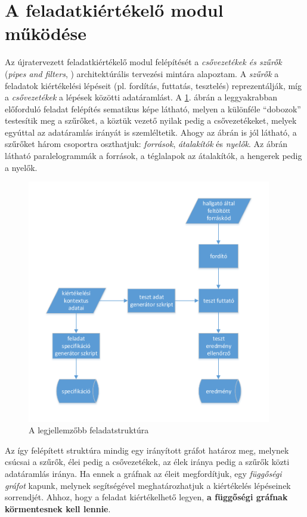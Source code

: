 \section{A feladatkiértékelő modul működése}
Az újratervezett feladatkiértékelő modul felépítését a \textit{csővezetékek és szűrők} (\textit{pipes and filters}, \cite{PipesAndFilters}) architektúrális tervezési mintára alapoztam.
A \textit{szűrők} a feladatok kiértékelési lépéseit (pl. fordítás, futtatás, tesztelés) reprezentálják, míg a \textit{csővezetékek} a lépések közötti adatáramlást.
A \ref{figure:example-pipeline}. ábrán a leggyakrabban előforduló feladat felépítés sematikus képe látható, melyen a különféle ``dobozok'' testesítik meg a szűrőket, a köztük vezető nyilak pedig a csővezetékeket, melyek egyúttal az adatáramlás irányát is szemléltetik.
Ahogy az ábrán is jól látható, a szűrőket három csoportra oszthatjuk: \textit{források}, \textit{átalakítók} és \textit{nyelők}.
Az ábrán látható paralelogrammák a források, a téglalapok az átalakítók, a hengerek pedig a nyelők.

\begin{figure}[h]
    \centering
    \includegraphics[width=0.95\textwidth]{figures/example-pipeline}
    \caption{A legjellemzőbb feladatstruktúra}
    \label{figure:example-pipeline}
\end{figure}

Az így felépített struktúra mindig egy irányított gráfot határoz meg, melynek csúcsai a szűrők, élei pedig a csővezetékek, az élek iránya pedig a szűrők közti adatáramlás iránya.
Ha ennek a gráfnak az éleit megfordítjuk, egy \textit{függőségi gráfot} kapunk, melynek segítségével meghatározhatjuk a kiértékelés lépéseinek sorrendjét.
Ahhoz, hogy a feladat kiértékelhető legyen, \textbf{a függőségi gráfnak körmentesnek kell lennie}. \cite{wiki:DependencyGraph}

